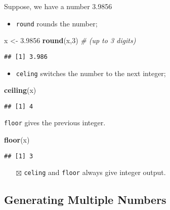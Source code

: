 \documentclass[
]{book}
\newenvironment{Shaded}{\begin{snugshade}}{\end{snugshade}}
\newcommand{\CommentTok}[1]{\textcolor[rgb]{0.56,0.35,0.01}{\textit{#1}}}
\newcommand{\DecValTok}[1]{\textcolor[rgb]{0.00,0.00,0.81}{#1}}
\newcommand{\FloatTok}[1]{\textcolor[rgb]{0.00,0.00,0.81}{#1}}
\newcommand{\KeywordTok}[1]{\textcolor[rgb]{0.13,0.29,0.53}{\textbf{#1}}}
\newcommand{\NormalTok}[1]{#1}
\newcommand{\StringTok}[1]{\textcolor[rgb]{0.31,0.60,0.02}{#1}}
\providecommand{\tightlist}{%
  \setlength{\itemsep}{0pt}\setlength{\parskip}{0pt}}
\begin{document}
Suppose, we have a number 3.9856

\begin{itemize}
\tightlist
\item
  \texttt{round} rounds the number;
\end{itemize}

\begin{Shaded}
\begin{Highlighting}[]
\NormalTok{x <-}\StringTok{ }\FloatTok{3.9856}
\KeywordTok{round}\NormalTok{(x,}\DecValTok{3}\NormalTok{) }\CommentTok{# (up to 3 digits)}
\end{Highlighting}
\end{Shaded}

\begin{verbatim}
## [1] 3.986
\end{verbatim}

\begin{itemize}
\tightlist
\item
  \texttt{celing} switches the number to the next integer;
\end{itemize}

\begin{Shaded}
\begin{Highlighting}[]
\KeywordTok{ceiling}\NormalTok{(x)}
\end{Highlighting}
\end{Shaded}

\begin{verbatim}
## [1] 4
\end{verbatim}

\texttt{floor} gives the previous integer.

\begin{Shaded}
\begin{Highlighting}[]
\KeywordTok{floor}\NormalTok{(x)}
\end{Highlighting}
\end{Shaded}

\begin{verbatim}
## [1] 3
\end{verbatim}

\begin{itemize}
\tightlist
\item[$\boxtimes$]
  \texttt{celing} and \texttt{floor} always give integer output.
\end{itemize}

\hypertarget{generating-multiple-numbers}{%
\subsection{Generating Multiple Numbers}\label{generating-multiple-numbers}}
\end{document}
